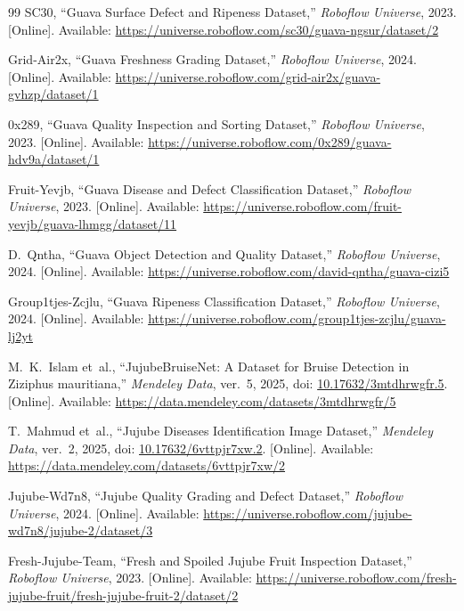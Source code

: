 \documentclass[11pt,a4paper]{article}
\begin{document}
\begin{thebibliography}{99}
SC30, ``Guava Surface Defect and Ripeness Dataset,'' \emph{Roboflow Universe}, 2023. [Online]. Available: \url{https://universe.roboflow.com/sc30/guava-ngsur/dataset/2}

Grid-Air2x, ``Guava Freshness Grading Dataset,'' \emph{Roboflow Universe}, 2024. [Online]. Available: \url{https://universe.roboflow.com/grid-air2x/guava-gvhzp/dataset/1}

0x289, ``Guava Quality Inspection and Sorting Dataset,'' \emph{Roboflow Universe}, 2023. [Online]. Available: \url{https://universe.roboflow.com/0x289/guava-hdv9a/dataset/1}

Fruit-Yevjb, ``Guava Disease and Defect Classification Dataset,'' \emph{Roboflow Universe}, 2023. [Online]. Available: \url{https://universe.roboflow.com/fruit-yevjb/guava-lhmgg/dataset/11}

D.~Qntha, ``Guava Object Detection and Quality Dataset,'' \emph{Roboflow Universe}, 2024. [Online]. Available: \url{https://universe.roboflow.com/david-qntha/guava-cizi5}

Group1tjes-Zcjlu, ``Guava Ripeness Classification Dataset,'' \emph{Roboflow Universe}, 2024. [Online]. Available: \url{https://universe.roboflow.com/group1tjes-zcjlu/guava-lj2yt}


M.~K.~Islam et~al., ``JujubeBruiseNet: A Dataset for Bruise Detection in Ziziphus mauritiana,'' \emph{Mendeley Data}, ver.~5, 2025, doi: \href{https://doi.org/10.17632/3mtdhrwgfr.5}{10.17632/3mtdhrwgfr.5}. [Online]. Available: \url{https://data.mendeley.com/datasets/3mtdhrwgfr/5}

T.~Mahmud et~al., ``Jujube Diseases Identification Image Dataset,'' \emph{Mendeley Data}, ver.~2, 2025, doi: \href{https://doi.org/10.17632/6vttpjr7xw.2}{10.17632/6vttpjr7xw.2}. [Online]. Available: \url{https://data.mendeley.com/datasets/6vttpjr7xw/2}

Jujube-Wd7n8, ``Jujube Quality Grading and Defect Dataset,'' \emph{Roboflow Universe}, 2024. [Online]. Available: \url{https://universe.roboflow.com/jujube-wd7n8/jujube-2/dataset/3}

Fresh-Jujube-Team, ``Fresh and Spoiled Jujube Fruit Inspection Dataset,'' \emph{Roboflow Universe}, 2023. [Online]. Available: \url{https://universe.roboflow.com/fresh-jujube-fruit/fresh-jujube-fruit-2/dataset/2}


\end{thebibliography}
\end{document}
